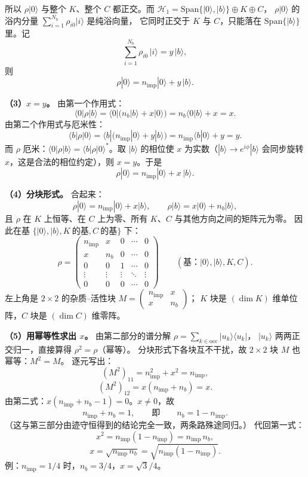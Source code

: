 \documentclass[11pt]{ctexart}
\begin{document}
所以 $\rho|0\rangle$ 与整个 $K$、整个 $C$ 都正交。而
$\mathcal{H}_1=\mathrm{Span}\{|0\rangle,|b\rangle\}\oplus K\oplus C$，
$\rho|0\rangle$ 的浴内分量 $\sum_{i=1}^{N_b}\rho_{i0}|i\rangle$ 是纯浴向量，
它同时正交于 $K$ 与 $C$，只能落在 $\mathrm{Span}\{|b\rangle\}$ 里。记
\[
\sum_{i=1}^{N_b}\rho_{i0}\,|i\rangle=y\,|b\rangle ,
\]
则
\[
\rho|0\rangle=n_{\mathrm{imp}}|0\rangle+y\,|b\rangle .
\]

\textbf{（3）$x=y$。}
由第一个作用式：
\[
\langle0|\rho|b\rangle
=
\langle0|\big(n_b|b\rangle+x|0\rangle\big)
=
n_b\langle0|b\rangle+x
=
x .
\]
由第二个作用式与厄米性：
\[
\langle b|\rho|0\rangle
=
\langle b|\big(n_{\mathrm{imp}}|0\rangle+y|b\rangle\big)
=
n_{\mathrm{imp}}\langle b|0\rangle+y
=
y .
\]
而 $\rho$ 厄米：$\langle0|\rho|b\rangle=\langle b|\rho|0\rangle^*$。取 $|b\rangle$ 的相位使
$x$ 为实数（$|b\rangle\to e^{i\phi}|b\rangle$ 会同步旋转 $x$，这是合法的相位约定），则
$x=y$。于是
\[
\rho|0\rangle=n_{\mathrm{imp}}|0\rangle+x\,|b\rangle .
\]

\textbf{（4）分块形式。}
合起来：
\[
\rho|0\rangle=n_{\mathrm{imp}}|0\rangle+x|b\rangle,\qquad
\rho|b\rangle=x|0\rangle+n_b|b\rangle,
\]
且 $\rho$ 在 $K$ 上恒等、在 $C$ 上为零、所有 $K$、$C$ 与其他方向之间的矩阵元为零。
因此在基 $\{|0\rangle,|b\rangle,K\ \text{的基},C\ \text{的基}\}$ 下：
\[
\rho
=
\begin{pmatrix}
n_{\mathrm{imp}} & x & 0 & \cdots & 0\\[2pt]
x & n_b & 0 & \cdots & 0\\[2pt]
0 & 0 & 1 & \cdots & 0\\[2pt]
\vdots & \vdots & \vdots & \ddots & \vdots\\[2pt]
0 & 0 & 0 & \cdots & 0
\end{pmatrix}
\qquad(\text{基：}|0\rangle,|b\rangle,K,C).
\]
左上角是 $2\times2$ 的杂质--活性块
$M=\begin{pmatrix}n_{\mathrm{imp}}&x\\ x&n_b\end{pmatrix}$；
$K$ 块是 $(\dim K)$ 维单位阵，$C$ 块是 $(\dim C)$ 维零阵。

\textbf{（5）用幂等性求出 $x$。}
由第二部分的谱分解 $\rho=\sum_{k\in\mathrm{occ}}|u_k\rangle\langle u_k|$，
$|u_k\rangle$ 两两正交归一，直接算得 $\rho^2=\rho$（幂等）。
分块形式下各块互不干扰，故 $2\times2$ 块 $M$ 也幂等：$M^2=M$。
逐元写出：
\[
(M^2)_{11}=n_{\mathrm{imp}}^2+x^2=n_{\mathrm{imp}} ,
\]
\[
(M^2)_{12}=x(n_{\mathrm{imp}}+n_b)=x .
\]
由第二式：$x(n_{\mathrm{imp}}+n_b-1)=0$。$x\neq0$，故
\[
n_{\mathrm{imp}}+n_b=1 ,
\qquad\text{即}\qquad
n_b=1-n_{\mathrm{imp}} .
\]
（这与第三部分由迹守恒得到的结论完全一致，两条路殊途同归。）
代回第一式：
\[
x^2=n_{\mathrm{imp}}(1-n_{\mathrm{imp}})=n_{\mathrm{imp}}\,n_b ,
\]
\[
x=\sqrt{n_{\mathrm{imp}}\,n_b}
=\sqrt{n_{\mathrm{imp}}(1-n_{\mathrm{imp}})} .
\]
例：$n_{\mathrm{imp}}=1/4$ 时，$n_b=3/4$，$x=\sqrt3/4$。
\end{document}
